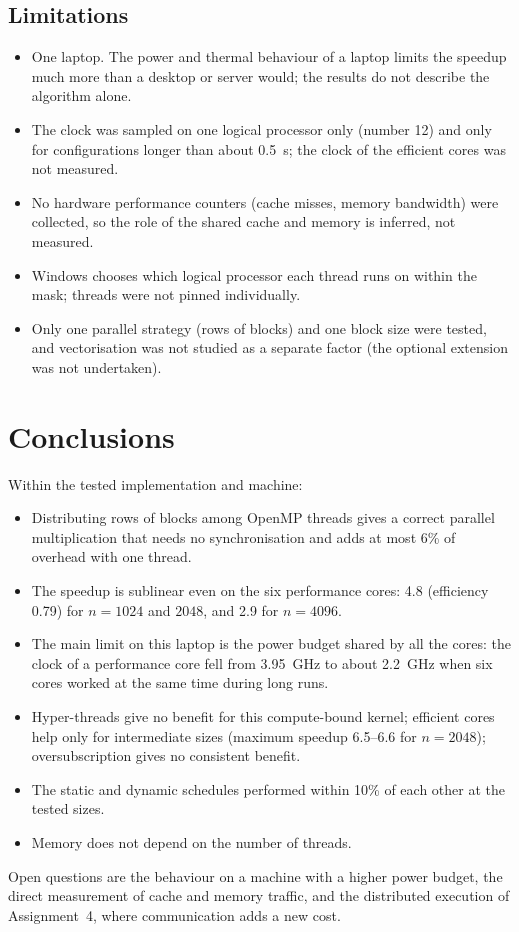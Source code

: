 \documentclass[12pt,a4paper]{report}
\begin{document}
\section{Limitations}

\begin{itemize}
  \item One laptop. The power and thermal behaviour of a laptop limits the speedup much more than a desktop or server
  would; the results do not describe the algorithm alone.
  \item The clock was sampled on one logical processor only (number 12) and only for configurations longer than about
  0.5~s; the clock of the efficient cores was not measured.
  \item No hardware performance counters (cache misses, memory bandwidth) were collected, so the role of the shared
  cache and memory is inferred, not measured.
  \item Windows chooses which logical processor each thread runs on within the mask; threads were not pinned
  individually.
  \item Only one parallel strategy (rows of blocks) and one block size were tested, and vectorisation was not
  studied as a separate factor (the optional extension was not undertaken).
\end{itemize}

\chapter{Conclusions}

Within the tested implementation and machine:
\begin{itemize}
  \item Distributing rows of blocks among OpenMP threads gives a correct parallel multiplication that needs no
  synchronisation and adds at most 6\% of overhead with one thread.
  \item The speedup is sublinear even on the six performance cores: 4.8 (efficiency 0.79) for $n = 1024$ and $2048$,
  and 2.9 for $n = 4096$.
  \item The main limit on this laptop is the power budget shared by all the cores: the clock of a performance core fell
  from 3.95~GHz to about 2.2~GHz when six cores worked at the same time during long runs.
  \item Hyper-threads give no benefit for this compute-bound kernel; efficient cores help only for intermediate sizes
  (maximum speedup 6.5--6.6 for $n = 2048$); oversubscription gives no consistent benefit.
  \item The static and dynamic schedules performed within 10\% of each other at the tested sizes.
  \item Memory does not depend on the number of threads.
\end{itemize}
Open questions are the behaviour on a machine with a higher power budget, the direct measurement of cache and memory
traffic, and the distributed execution of Assignment~4, where communication adds a new cost.
\end{document}
